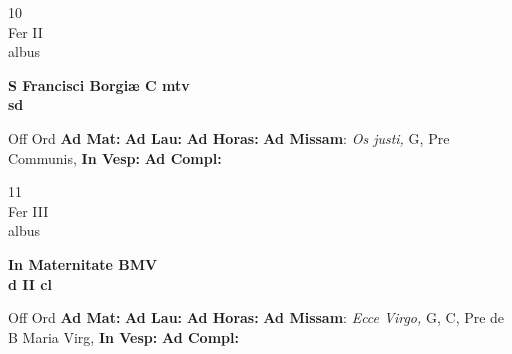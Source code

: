 \documentclass[10pt, openany]{book}
\begin{document}
        \begin{center}
            \begin{minipage}{3.5in}
                \vspace{2em}
                \begin{minipage}{0.5in}
                    {\Huge 10} \\
                    {\normalsize Fer II} \\
                    {\normalsize albus}
                \end{minipage}
                \begin{minipage}{3.0in}
                    \textbf{ \large S Francisci Borgiæ C mtv \\
                    \textnormal{\normalsize sd}} \\ 
                \end{minipage}
                \begin{justify}Off Ord
                    \textbf{Ad Mat: }
                    \textbf{Ad Lau: }
                    \textbf{Ad Horas: }\textbf{Ad Missam}: \textit{Os justi,} G, Pre Communis,  
                    \textbf{In Vesp: }
                    \textbf{Ad Compl: }
                \end{justify}
            \end{minipage}
        \end{center}
    
        \begin{center}
            \begin{minipage}{3.5in}
                \vspace{2em}
                \begin{minipage}{0.5in}
                    {\Huge 11} \\
                    {\normalsize Fer III} \\
                    {\normalsize albus}
                \end{minipage}
                \begin{minipage}{3.0in}
                    \textbf{ \large In Maternitate BMV \\
                    \textnormal{\normalsize d II cl}} \\ 
                \end{minipage}
                \begin{justify}Off Ord
                    \textbf{Ad Mat: }
                    \textbf{Ad Lau: }
                    \textbf{Ad Horas: }\textbf{Ad Missam}: \textit{Ecce Virgo,} G, C, Pre de B Maria Virg,  
                    \textbf{In Vesp: }
                    \textbf{Ad Compl: }
                \end{justify}
            \end{minipage}
        \end{center}
    
\end{document}
